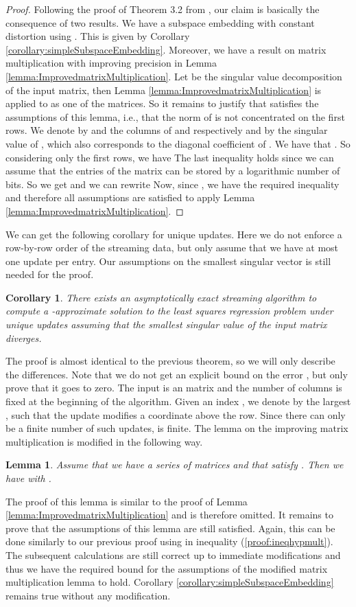 \documentclass[a4paper,11pt,oneside,english,onecolumn]{article}
\newtheorem{lemma}[theorem]{Lemma}
\newtheorem{corollary}[theorem]{Corollary}
\theoremstyle{definition}
\begin{document}
\begin{proof}
Following the proof of Theorem 3.2 from \cite{LinAlgStream}, our claim is basically the consequence of two results. We have a subspace embedding with constant distortion using . This is given by Corollary \ref{corollary:simpleSubspaceEmbedding}. Moreover, we have a result on matrix multiplication with improving precision in Lemma \ref{lemma:ImprovedmatrixMultiplication}. Let  be the singular value decomposition of the input matrix, then Lemma \ref{lemma:ImprovedmatrixMultiplication} is applied to  as one of the matrices. So it remains to justify that  satisfies the assumptions of this lemma, i.e., that the norm of  is not concentrated on the first  rows. 
We denote by  and  the columns of  and  respectively and by  the  singular value of , which also corresponds to the  diagonal coefficient of . We have that . So considering only the  first rows, we have 
The last inequality holds since we can assume that the entries of the matrix can be stored by a logarithmic number of bits. So we get  and we can rewrite 
Now, since , we have the required inequality and therefore all assumptions are satisfied to apply Lemma \ref{lemma:ImprovedmatrixMultiplication}.
\end{proof}

We can get the following corollary for unique updates. Here we do not enforce a row-by-row order of the streaming data, but only assume that we have at most one update per entry. Our assumptions on the smallest singular vector is still needed for the proof.

\begin{corollary}
There exists an asymptotically exact streaming algorithm to compute a -approximate solution to the least squares regression problem under unique updates assuming that the smallest singular value of the input matrix diverges.
\end{corollary}

The proof is almost identical to the previous theorem, so we will only describe the differences. Note that we do not get an explicit bound on the error , but only prove that it goes to zero. The input  is an  matrix and the number of columns  is fixed at the beginning of the algorithm. Given an index , we denote by  the largest , such that the  update modifies a coordinate above the  row. Since there can only be a finite number of such updates,  is finite.
The lemma on the improving matrix multiplication is modified in the following way.
\begin{lemma}
Assume that we have a series of matrices  and  that satisfy
.
Then we have 
with .
\end{lemma}
The proof of this lemma is similar to the proof of Lemma \ref{lemma:ImprovedmatrixMultiplication} and is therefore omitted. It remains to prove that the assumptions of this lemma are still satisfied. Again, this can be done similarly to our previous proof using  in inequality (\ref{proof:ineqhypmult}). The subsequent calculations are still correct up to immediate modifications and thus we have the required bound for the assumptions of the modified matrix multiplication lemma to hold. Corollary \ref{corollary:simpleSubspaceEmbedding} remains true without any modification.
\end{document}
